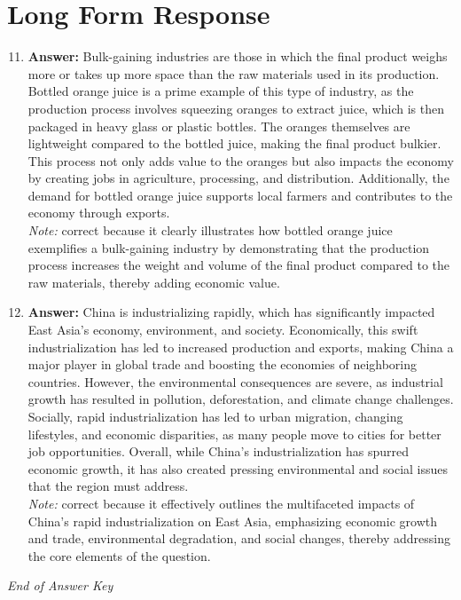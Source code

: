 \documentclass[12pt]{article}
\begin{document}
\section*{Long Form Response}
\begin{enumerate}[label=\arabic*.]
\setcounter{enumi}{10}
\item \textbf{Answer:} Bulk-gaining industries are those in which the final product weighs more or takes up more space than the raw materials used in its production. Bottled orange juice is a prime example of this type of industry, as the production process involves squeezing oranges to extract juice, which is then packaged in heavy glass or plastic bottles. The oranges themselves are lightweight compared to the bottled juice, making the final product bulkier. This process not only adds value to the oranges but also impacts the economy by creating jobs in agriculture, processing, and distribution. Additionally, the demand for bottled orange juice supports local farmers and contributes to the economy through exports.
\\ \textit{Note:} correct because it clearly illustrates how bottled orange juice exemplifies a bulk-gaining industry by demonstrating that the production process increases the weight and volume of the final product compared to the raw materials, thereby adding economic value.
\item \textbf{Answer:} China is industrializing rapidly, which has significantly impacted East Asia's economy, environment, and society. Economically, this swift industrialization has led to increased production and exports, making China a major player in global trade and boosting the economies of neighboring countries. However, the environmental consequences are severe, as industrial growth has resulted in pollution, deforestation, and climate change challenges. Socially, rapid industrialization has led to urban migration, changing lifestyles, and economic disparities, as many people move to cities for better job opportunities. Overall, while China's industrialization has spurred economic growth, it has also created pressing environmental and social issues that the region must address.
\\ \textit{Note:} correct because it effectively outlines the multifaceted impacts of China's rapid industrialization on East Asia, emphasizing economic growth and trade, environmental degradation, and social changes, thereby addressing the core elements of the question.
\end{enumerate}

\vfill
\noindent\textit{End of Answer Key}
\end{document}
